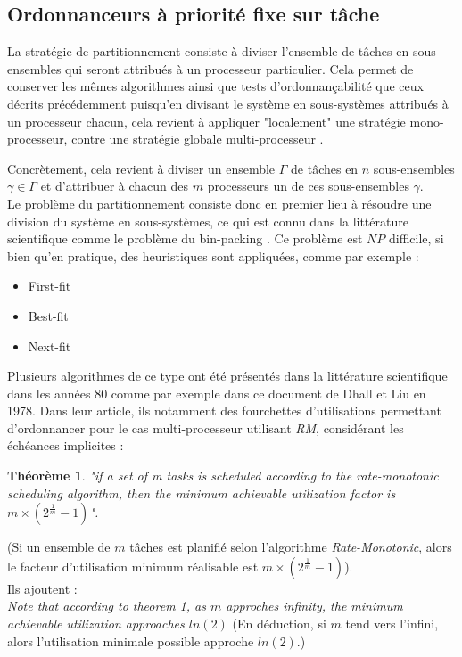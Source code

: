 \documentclass[11pt,a4paper,oneside]{report}
\newtheorem{mytheorem}{Théorème}
\begin{document}
\subsection{Ordonnanceurs à priorité fixe sur tâche}

La stratégie de partitionnement consiste à diviser l'ensemble de tâches en sous-ensembles qui seront 
attribués à un processeur particulier. Cela permet de conserver les mêmes algorithmes ainsi 
que tests d'ordonnançabilité que ceux 
décrits précédemment puisqu'en divisant le système en sous-systèmes attribués à un 
processeur chacun, cela revient à appliquer "localement" une stratégie mono-processeur, contre 
une stratégie globale multi-processeur \cite{ndoye_ordonnancement_2014}.

Concrètement, cela revient à diviser un ensemble $\Gamma$ de tâches en $n$ sous-ensembles 
$\gamma \in \Gamma$ et d'attribuer à chacun des $m$ processeurs un de ces sous-ensembles $\gamma$.\\


Le problème du partitionnement consiste donc en premier lieu 
à résoudre une division du système en sous-systèmes, ce qui est connu dans la 
littérature scientifique comme le problème du bin-packing \cite{ausiello_approximation_1984}.
Ce problème est $NP$ difficile, si bien qu'en pratique, 
des heuristiques sont appliquées, comme par exemple :\\
\begin{itemize}
	\item First-fit 
	\item Best-fit
	\item Next-fit
\end{itemize}

Plusieurs algorithmes de ce type ont été présentés dans la littérature scientifique
dans les années 80 comme par exemple \cite{dhall_real-time_1978} dans ce 
document de Dhall et Liu en 1978. 
Dans leur article, ils notamment des fourchettes d'utilisations 
permettant d'ordonnancer pour le cas multi-processeur utilisant \textit{RM}, 
considérant les échéances implicites :
\begin{mytheorem}
\textit{"if a set of m tasks is scheduled according to the rate-monotonic scheduling algorithm, then the minimum achievable utilization factor is $m\times(2^{\frac{1}{m}} - 1)$".}
\end{mytheorem}
(Si un ensemble de $m$ tâches est planifié selon l'algorithme \textit{Rate-Monotonic}, 
alors le facteur d'utilisation minimum réalisable est $m\times(2^{\frac{1}{m}} - 1)$). \\
Ils ajoutent :\\
\textit{Note that according to theorem 1, as $m$ approches infinity, 
	the minimum achievable utilization approaches $ln(2)$}
(En déduction, si $m$ tend vers l'infini, alors l'utilisation minimale possible approche $ln(2)$.) \\
\end{document}
